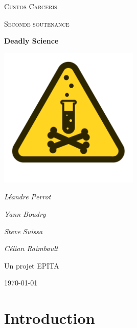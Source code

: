 \documentclass{article}
\begin{document}
\begin{titlepage}
	\centering
	{\scshape\LARGE Custos Carceris\par}
	\vspace{1cm}
	{\scshape\Large Seconde soutenance \par}
	\vspace{1.5cm}
	{\huge\bfseries Deadly Science\par}
	\vspace{2cm}
	\includegraphics[width=0.5\textwidth]{logo.png}\par\vspace{1cm}
	{\Large\itshape Léandre Perrot\par}
	{\Large\itshape Yann Boudry\par}
	{\Large\itshape Steve Suissa\par}
	{\Large\itshape Célian Raimbault\par}
	\vfill
	Un projet EPITA
	\vfill
	{\large \today\par}
\end{titlepage}



\newpage
\tableofcontents



\newpage
\section{Introduction}
\end{document}
